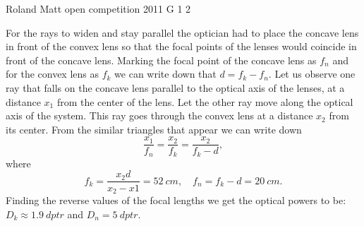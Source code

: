 \documentclass[11pt]{article}
\begin{document}
{Roland Matt} %
{open competition} %
{2011} %
{G 1} %
{2} %
{

\ifEngSolution
For the rays to widen and stay parallel the optician had to place the concave lens in front of the convex lens so that the focal points of the lenses would coincide in front of the concave lens. Marking the focal point of the concave lens as $f_{n}$ and for the convex lens as $f_{k}$ we can write down that $d=f_{k}-f_{n}$. Let us observe one ray that falls on the concave lens parallel to the optical axis of the lenses, at a distance $x_{1}$ from the center of the lens. Let the other ray move along the optical axis of the system. This ray goes through the convex lens at a distance $x_{2}$ from its center. From the similar triangles that appear we can write down
\[ \frac{x_{1}}{f_{n}}=\frac{x_{2}}{f_{k}}=\frac{x_{2}}{f_{k}-d}, \] 
where
\[ f_{k}=\frac{x_{2}d}{x_{2}-x{1}}=\SI{52}{cm},\quad  f_{n}=f_{k}-d=\SI{20}{cm}.\] 
Finding the reverse values of the focal lengths we get the optical powers to be: $D_{k}\approx\SI{1,9}{dptr}$ and $D_{n}=\SI{5}{dptr}$.
\fi
}
\end{document}
